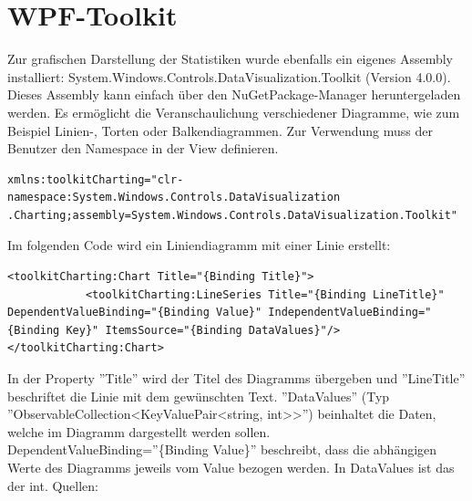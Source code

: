 \section{WPF-Toolkit}
Zur grafischen Darstellung der Statistiken wurde ebenfalls ein eigenes Assembly installiert:  System.Windows.Controls.DataVisualization.Toolkit (Version 4.0.0). Dieses Assembly kann einfach über den NuGetPackage-Manager heruntergeladen werden. Es ermöglicht die Veranschaulichung verschiedener Diagramme, wie zum Beispiel Linien-, Torten oder Balkendiagrammen. Zur Verwendung muss der Benutzer den Namespace in der View definieren.
\begin{lstlisting}
xmlns:toolkitCharting="clr-namespace:System.Windows.Controls.DataVisualization
.Charting;assembly=System.Windows.Controls.DataVisualization.Toolkit"
\end{lstlisting}
Im folgenden Code wird ein Liniendiagramm mit einer Linie erstellt:
\begin{lstlisting}
<toolkitCharting:Chart Title="{Binding Title}">
            <toolkitCharting:LineSeries Title="{Binding LineTitle}"  DependentValueBinding="{Binding Value}" IndependentValueBinding="{Binding Key}" ItemsSource="{Binding DataValues}"/>
</toolkitCharting:Chart>
\end{lstlisting}
In der Property ''Title'' wird der Titel des Diagramms übergeben und ''LineTitle'' beschriftet die Linie mit dem gewünschten Text. ''DataValues'' (Typ ''ObservableCollection\textless KeyValuePair\textless string, int\textgreater \textgreater'') beinhaltet die Daten, welche im Diagramm dargestellt werden sollen. DependentValueBinding=''\{Binding Value\}'' beschreibt, dass die abhängigen Werte des Diagramms jeweils vom Value bezogen werden. In DataValues ist das der int. \newline
Quellen: \cite{c-sharpcorner_charting_2017}
